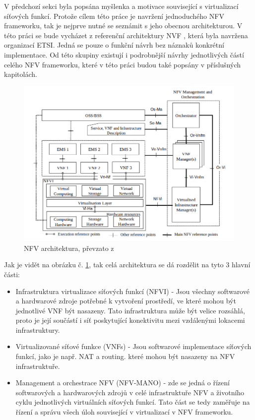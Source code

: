 V předchozí sekci byla popsána myšlenka a motivace související s virtualizací síťových funkcí. Protože cílem této práce je navržení jednoduchého NFV frameworku, tak je nejprve nutné se seznámit s jeho obecnou architekturou. V této práci se bude vycházet z referenční architektury NVF \cite{NFV_architektura}, která byla navržena organizací ETSI. Jedná se pouze o funkční návrh bez náznaků konkrétní implementace. Od této skupiny existují i podrobnější návrhy jednotlivých částí celého NFV frameworku, které v této práci budou také popsány v příslušných kapitolách.

\begin{figure}[h]
\begin{centering}
\includegraphics[scale=0.5]{images/NFV_architektura}
\par\end{centering}
\caption{NFV architektura, převzato z \cite{NFV_architektura}\label{fig:NFV_architektura}}
\end{figure}

Jak je vidět na obrázku č. \ref{fig:NFV_architektura}, tak celá architektura se dá rozdělit na tyto 3 hlavní části:

\begin{itemize}
\item Infrastruktura virtualizace síťových funkcí (NFVI) - Jsou všechny softwarové a hardwarové zdroje potřebné k vytvoření prostředí, ve které mohou být jednotlivé VNF být nasazeny. Tato infrastruktura může být velice rozsáhlá, proto je její součástí i síť poskytující konektivitu mezi vzdálenými lokacemi infrastruktury.\cite{NFV_terminology}
\item Virtualizované síťové funkce (VNFs) - Jsou softwarové implementace síťových funkcí, jako je např. NAT a routing. které mohou být nasazeny na NFV infrastruktuře.
\item Management a orchestrace NFV (NFV-MANO) - zde se jedná o řízení softwarových a hardwarových zdrojů v celé infrastruktuře NFV a životního cyklu jednotlivých virtuálních síťových funkcí. Tato část se tedy zaměřuje na řízení a správu všech úloh související v virtualizací v NFV frameworku. \cite{NFV_terminology}
\end{itemize}

